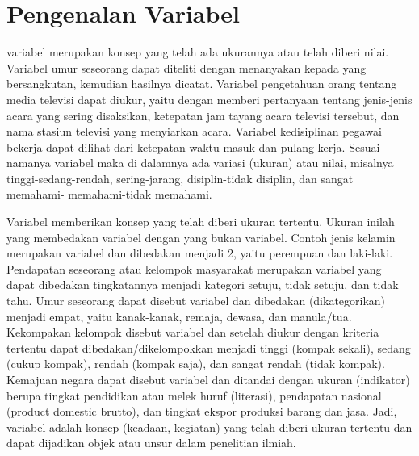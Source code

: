 

\section{Pengenalan Variabel}
variabel merupakan konsep yang telah ada ukurannya atau telah diberi nilai. Variabel umur seseorang dapat diteliti dengan 
menanyakan kepada yang bersangkutan, kemudian hasilnya dicatat. Variabel pengetahuan orang tentang media televisi dapat diukur,  yaitu dengan memberi pertanyaan tentang jenis-jenis acara yang sering disaksikan, ketepatan jam tayang acara televisi tersebut, 
dan nama stasiun televisi yang menyiarkan acara. Variabel kedisiplinan pegawai bekerja dapat dilihat dari ketepatan waktu masuk  dan pulang kerja. Sesuai namanya variabel maka di dalamnya ada variasi (ukuran) atau nilai, misalnya tinggi-sedang-rendah, 
sering-jarang, disiplin-tidak disiplin, dan sangat memahami- memahami-tidak memahami.

Variabel memberikan konsep yang telah diberi ukuran tertentu. Ukuran inilah yang membedakan variabel dengan yang bukan variabel. 
Contoh jenis kelamin merupakan variabel dan dibedakan menjadi 2, yaitu perempuan dan laki-laki. Pendapatan seseorang atau 
kelompok masyarakat merupakan variabel yang dapat dibedakan tingkatannya menjadi kategori setuju, tidak setuju, dan tidak tahu. 
Umur seseorang dapat disebut variabel dan dibedakan (dikategorikan) menjadi empat, yaitu kanak-kanak, remaja, dewasa, dan 
manula/tua. Kekompakan kelompok disebut variabel dan setelah diukur dengan kriteria tertentu dapat dibedakan/dikelompokkan 
menjadi tinggi (kompak sekali), sedang (cukup kompak), rendah (kompak saja), dan sangat rendah (tidak kompak). Kemajuan negara 
dapat disebut variabel dan ditandai dengan ukuran (indikator) berupa tingkat pendidikan atau melek huruf (literasi), pendapatan 
nasional (product domestic brutto), dan tingkat ekspor produksi barang dan jasa. Jadi, variabel adalah konsep (keadaan, 
kegiatan) yang telah diberi ukuran tertentu dan dapat dijadikan objek atau unsur dalam penelitian ilmiah.

